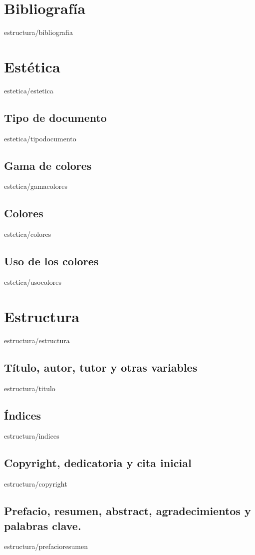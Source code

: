 \documentclass[epsbased,copyright,final,printable,covers,extendedindex,firstnumbered,tfg,gnuplot]{tfgtfmthesisuam}
\begin{document}
\chapter{Bibliografía\label{CAP:BIBLIOGRAFIA}}{estructura/bibliografia}





\chapter{Estética\label{CAP:ESTETICA}}{estetica/estetica}
  \section{Tipo de documento\label{SEC:TIPODOC}}{estetica/tipodocumento}
  \section{Gama de colores\label{SEC:GAMASEL}}{estetica/gamacolores}
  \section{Colores\label{SEC:COLORES}}{estetica/colores}
  \section{Uso de los colores\label{SEC:USOCOLORES}}{estetica/usocolores}

\chapter{Estructura\label{CAP:ESTRUCTURA}}{estructura/estructura}
  \section{Título, autor, tutor y otras variables\label{SEC:VARIABLES}}{estructura/titulo}
  \section{Índices\label{SEC:INDICES}}{estructura/indices}
  \section{Copyright, dedicatoria y cita inicial\label{SEC:COPYRIGHT}}{estructura/copyright}
  \section[Prefacio, resumen ...]{Prefacio, resumen, abstract, agradecimientos y palabras clave.\label{SEC:PREFACIO}}{estructura/prefacioresumen}
\end{document}
